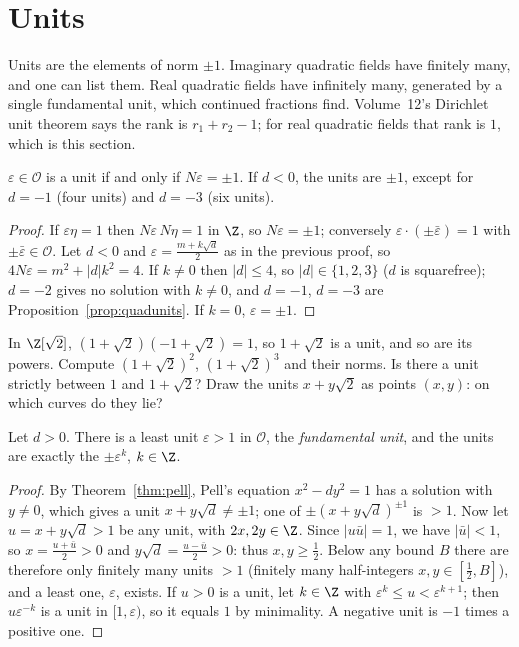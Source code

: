 \section{Units}

Units are the elements of norm $\pm 1$. Imaginary quadratic fields have finitely many, and one can list them. Real quadratic fields have infinitely many, generated by a single fundamental unit, which continued fractions find. Volume~12's Dirichlet unit theorem says the rank is $r_1+r_2-1$; for real quadratic fields that rank is $1$, which is this section.

\begin{proposition}\label{prop:qunits}
$\varepsilon\in\mathcal O$ is a unit if and only if $N\varepsilon=\pm1$. If $d<0$, the units are $\pm1$, except for $d=-1$ (four units) and $d=-3$ (six units).
\end{proposition}
\begin{proof}
If $\varepsilon\eta=1$ then $N\varepsilon\,N\eta=1$ in $\Z$, so $N\varepsilon=\pm1$; conversely $\varepsilon\cdot(\pm\bar\varepsilon)=1$ with $\pm\bar\varepsilon\in\mathcal O$. Let $d<0$ and $\varepsilon=\frac{m+k\sqrt d}2$ as in the previous proof, so $4N\varepsilon=m^2+|d|k^2=4$. If $k\ne0$ then $|d|\le4$, so $|d|\in\{1,2,3\}$ ($d$ is squarefree); $d=-2$ gives no solution with $k\ne0$, and $d=-1$, $d=-3$ are Proposition~\ref{prop:quadunits}. If $k=0$, $\varepsilon=\pm1$.
\end{proof}

\begin{think}
In $\Z[\sqrt2]$, $(1+\sqrt2)(-1+\sqrt2)=1$, so $1+\sqrt2$ is a unit, and so are its powers. Compute $(1+\sqrt2)^2$, $(1+\sqrt2)^3$ and their norms. Is there a unit strictly between $1$ and $1+\sqrt2$? Draw the units $x+y\sqrt2$ as points $(x,y)$: on which curves do they lie?
\end{think}

\begin{theorem}\label{thm:realunits}
Let $d>0$. There is a least unit $\varepsilon>1$ in $\mathcal O$, the \emph{fundamental unit}, and the units are exactly the $\pm\varepsilon^k$, $k\in\Z$.
\end{theorem}
\begin{proof}
By Theorem~\ref{thm:pell}, Pell's equation $x^2-dy^2=1$ has a solution with $y\ne0$, which gives a unit $x+y\sqrt d\ne\pm1$; one of $\pm(x+y\sqrt d)^{\pm1}$ is $>1$. Now let $u=x+y\sqrt d>1$ be any unit, with $2x,2y\in\Z$. Since $|u\bar u|=1$, we have $|\bar u|<1$, so $x=\frac{u+\bar u}2>0$ and $y\sqrt d=\frac{u-\bar u}2>0$: thus $x,y\ge\frac12$. Below any bound $B$ there are therefore only finitely many units $>1$ (finitely many half-integers $x,y\in\left[\frac12,B\right]$), and a least one, $\varepsilon$, exists. If $u>0$ is a unit, let $k\in\Z$ with $\varepsilon^k\le u<\varepsilon^{k+1}$; then $u\varepsilon^{-k}$ is a unit in $[1,\varepsilon)$, so it equals $1$ by minimality. A negative unit is $-1$ times a positive one.
\end{proof}

